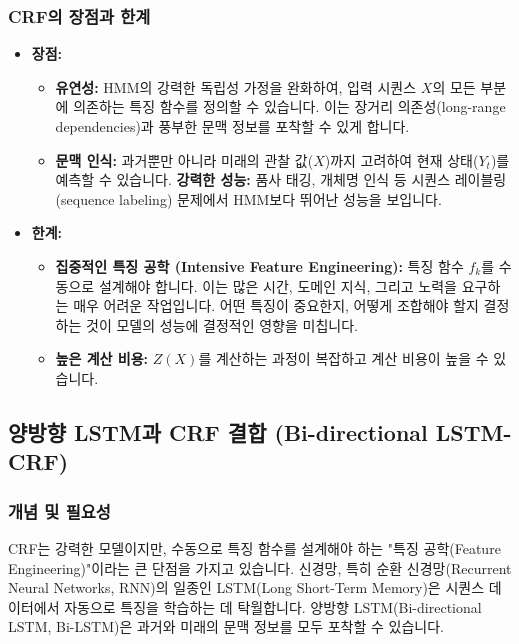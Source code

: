 \documentclass[11pt,a4paper]{article}
\theoremstyle{definition}
\begin{document}
\subsubsection{CRF의 장점과 한계}
\begin{itemize}
    \item \textbf{장점:}
    \begin{itemize}
        \item \textbf{유연성:} HMM의 강력한 독립성 가정을 완화하여, 입력 시퀀스 $X$의 모든 부분에 의존하는 특징 함수를 정의할 수 있습니다. 이는 장거리 의존성(long-range dependencies)과 풍부한 문맥 정보를 포착할 수 있게 합니다.
        \item \textbf{문맥 인식:} 과거뿐만 아니라 미래의 관찰 값($X$)까지 고려하여 현재 상태($Y_t$)를 예측할 수 있습니다.
        \textbf{강력한 성능:} 품사 태깅, 개체명 인식 등 시퀀스 레이블링(sequence labeling) 문제에서 HMM보다 뛰어난 성능을 보입니다.
    \end{itemize}
    \item \textbf{한계:}
    \begin{itemize}
        \item \textbf{집중적인 특징 공학 (Intensive Feature Engineering):} 특징 함수 $f_k$를 수동으로 설계해야 합니다. 이는 많은 시간, 도메인 지식, 그리고 노력을 요구하는 매우 어려운 작업입니다. 어떤 특징이 중요한지, 어떻게 조합해야 할지 결정하는 것이 모델의 성능에 결정적인 영향을 미칩니다.
        \item \textbf{높은 계산 비용:} $Z(X)$를 계산하는 과정이 복잡하고 계산 비용이 높을 수 있습니다.
    \end{itemize}
\end{itemize}

\subsection{양방향 LSTM과 CRF 결합 (Bi-directional LSTM-CRF)}

\subsubsection{개념 및 필요성}
CRF는 강력한 모델이지만, 수동으로 특징 함수를 설계해야 하는 "특징 공학(Feature Engineering)"이라는 큰 단점을 가지고 있습니다. 신경망, 특히 순환 신경망(Recurrent Neural Networks, RNN)의 일종인 LSTM(Long Short-Term Memory)은 시퀀스 데이터에서 자동으로 특징을 학습하는 데 탁월합니다. 양방향 LSTM(Bi-directional LSTM, Bi-LSTM)은 과거와 미래의 문맥 정보를 모두 포착할 수 있습니다.
\end{document}
